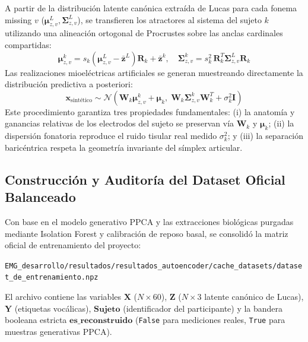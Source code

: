 \documentclass[11pt,a4paper,openany]{book}
\theoremstyle{definition}
\begin{document}
A partir de la distribución latente canónica extraída de Lucas para cada fonema missing $v$ ($\boldsymbol{\mu}_{z, v}^L, \boldsymbol{\Sigma}_{z, v}^L$), se transfieren los atractores al sistema del sujeto $k$ utilizando una alineación ortogonal de Procrustes sobre las anclas cardinales compartidas:
\begin{equation}
    \boldsymbol{\mu}_{z, v}^k = s_k (\boldsymbol{\mu}_{z, v}^L - \bar{\mathbf{z}}^L) \mathbf{R}_k + \bar{\mathbf{z}}^k, \quad \boldsymbol{\Sigma}_{z, v}^k = s_k^2 \, \mathbf{R}_k^T \boldsymbol{\Sigma}_{z, v}^L \mathbf{R}_k
\end{equation}
Las realizaciones mioeléctricas artificiales se generan muestreando directamente la distribución predictiva a posteriori:
\begin{equation}
    \mathbf{x}_{\text{sintético}} \sim \mathcal{N}\left( \mathbf{W}_k \boldsymbol{\mu}_{z, v}^k + \boldsymbol{\mu}_k, \; \mathbf{W}_k \boldsymbol{\Sigma}_{z, v}^k \mathbf{W}_k^T + \sigma_k^2 \mathbf{I} \right)
\end{equation}
Este procedimiento garantiza tres propiedades fundamentales: (i) la anatomía y ganancias relativas de los electrodos del sujeto se preservan vía $\mathbf{W}_k$ y $\boldsymbol{\mu}_k$; (ii) la dispersión fonatoria reproduce el ruido tisular real medido $\sigma_k^2$; y (iii) la separación baricéntrica respeta la geometría invariante del símplex articular.

\subsection{Construcción y Auditoría del Dataset Oficial Balanceado}
\label{subsec:dataset_oficial_balanceado}

Con base en el modelo generativo PPCA y las extracciones biológicas purgadas mediante Isolation Forest y calibración de reposo basal, se consolidó la matriz oficial de entrenamiento del proyecto:
\begin{center}
    \texttt{EMG\_desarrollo/resultados/resultados\_autoencoder/cache\_datasets/dataset\_de\_entrenamiento.npz}
\end{center}

El archivo contiene las variables $\mathbf{X}$ ($N \times 60$), $\mathbf{Z}$ ($N \times 3$ latente canónico de Lucas), $\mathbf{Y}$ (etiquetas vocálicas), $\mathbf{Sujeto}$ (identificador del participante) y la bandera booleana estricta $\mathbf{es\_reconstruido}$ (\texttt{False} para mediciones reales, \texttt{True} para muestras generativas PPCA).
\end{document}
